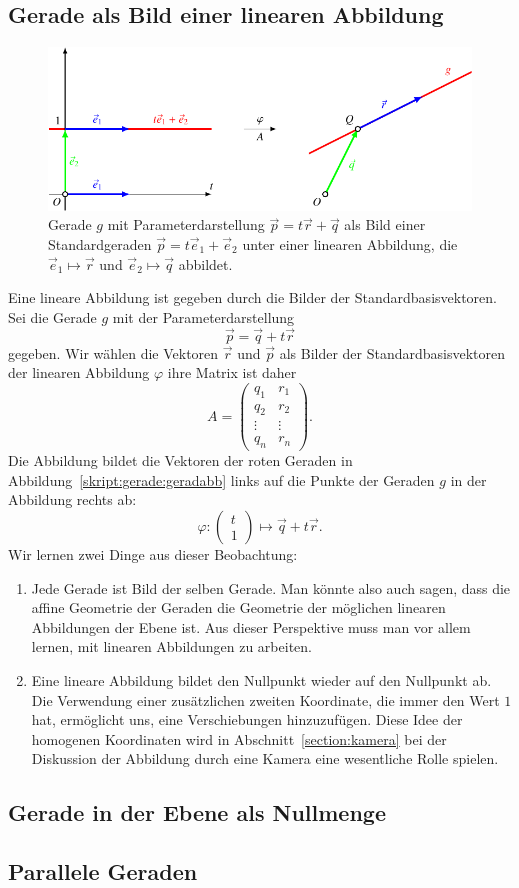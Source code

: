 \subsection{Gerade als Bild einer linearen Abbildung}
\begin{figure}
\centering
\includegraphics{3/images/geradeabb.pdf}
\caption{Gerade $g$ mit Parameterdarstellung $\vec{p} = t\vec{r}+\vec{q}$
als Bild einer Standardgeraden $\vec{p}=t\vec{e}_1+\vec{e}_2$ unter
einer linearen Abbildung, die $\vec{e}_1\mapsto\vec{r}$
und $\vec{e}_2\mapsto\vec{q}$ abbildet.
\label{skript:gerade:geradabb}}
\end{figure}
Eine lineare Abbildung ist gegeben durch die Bilder der
Standardbasisvektoren.
Sei die Gerade $g$ mit der Parameterdarstellung
\[
\vec{p}
=
\vec{q} + t\vec{r}
\]
gegeben.
Wir wählen die Vektoren $\vec{r}$ und $\vec{p}$ als Bilder der
Standardbasisvektoren der linearen Abbildung $\varphi$ ihre Matrix ist
daher 
\[
A=
\begin{pmatrix}
q_1   &r_1   \\
q_2   &r_2   \\
\vdots&\vdots\\
q_n   &r_n   
\end{pmatrix}.
\]
Die Abbildung bildet die Vektoren der roten Geraden in
Abbildung~\eqref{skript:gerade:geradabb} links auf die Punkte der
Geraden $g$ in der Abbildung rechts ab:
\[
\varphi
:
\begin{pmatrix}
t\\1
\end{pmatrix}
\mapsto
\vec{q}+t\vec{r}.
\]
Wir lernen zwei Dinge aus dieser Beobachtung:
\begin{enumerate}
\item
Jede Gerade ist Bild der selben Gerade.
Man könnte also auch sagen, dass die affine Geometrie der Geraden
die Geometrie der möglichen linearen Abbildungen der Ebene ist.
Aus dieser Perspektive muss man vor allem lernen, mit linearen
Abbildungen zu arbeiten.
\item
Eine lineare Abbildung bildet den Nullpunkt wieder auf den Nullpunkt ab.
Die Verwendung einer zusätzlichen zweiten Koordinate, die immer den
Wert $1$ hat, ermöglicht uns, eine Verschiebungen hinzuzufügen.
Diese Idee der homogenen Koordinaten wird in Abschnitt~\ref{section:kamera}
bei der Diskussion der Abbildung durch eine Kamera eine wesentliche Rolle
spielen.
\end{enumerate}


%
%
%
\subsection{Gerade in der Ebene als Nullmenge}

%
%
\subsection{Parallele Geraden}

